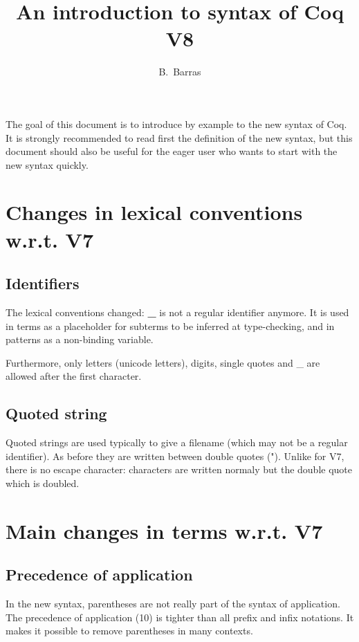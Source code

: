 \documentclass{article}
\author{B.~Barras}
\title{An introduction to syntax of Coq V8}
\def\TERM#1{\textsf{\bf #1}}
\begin{document}
\maketitle

The goal of this document is to introduce by example to the new syntax of
Coq. It is strongly recommended to read first the definition of the new
syntax, but this document should also be useful for the eager user who wants
to start with the new syntax quickly.


\section{Changes in lexical conventions w.r.t. V7}

\subsection{Identifiers}

The lexical conventions changed: \TERM{_} is not a regular identifier
anymore. It is used in terms as a placeholder for subterms to be inferred
at type-checking, and in patterns as a non-binding variable.

Furthermore, only letters (unicode letters), digits, single quotes and
_ are allowed after the first character.

\subsection{Quoted string}

Quoted strings are used typically to give a filename (which may not
be a regular identifier). As before they are written between double
quotes ("). Unlike for V7, there is no escape character: characters
are written normaly but the double quote which is doubled.

\section{Main changes in terms w.r.t. V7}


\subsection{Precedence of application}

In the new syntax, parentheses are not really part of the syntax of
application. The precedence of application (10) is tighter than all
prefix and infix notations. It makes it possible to remove parentheses
in many contexts.
\end{document}
